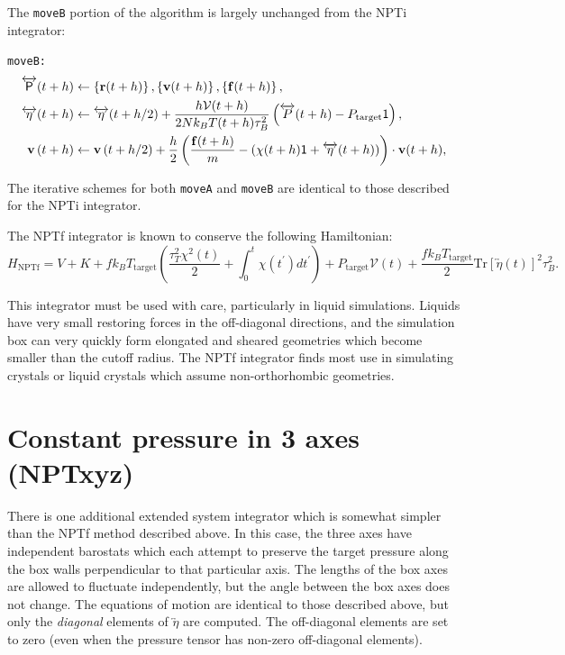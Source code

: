 \documentclass[]{book}
\begin{document}
The {\tt moveB} portion of the algorithm is largely unchanged from the
NPTi integrator:

{\tt moveB:}
\begin{align*}
\overleftrightarrow{\mathsf{P}}(t + h) &\leftarrow \left\{{\bf r}
	(t + h)\right\}, \left\{{\bf v}(t 
	+ h)\right\}, \left\{{\bf f}(t + h)\right\} ,\\
%
\overleftrightarrow{\eta}(t + h) &\leftarrow 
	\overleftrightarrow{\eta}(t + h / 2) +
	\frac{h \mathcal{V}(t + h)}{2 N k_B T(t + h) 
	\tau_B^2} \left( \overleftrightarrow{P}(t + h) 
	- P_{\mathrm{target}}\mathsf{1} \right) ,\\ 
%
{\bf v}\left(t + h \right)  &\leftarrow {\bf v}\left(t 
	+ h / 2 \right) + \frac{h}{2} \left(
	\frac{{\bf f}(t + h)}{m} - 
	(\chi(t + h)\mathsf{1} + \overleftrightarrow{\eta}(t 
	+ h)) \right) \cdot {\bf v}(t + h), \\
\end{align*}

The iterative schemes for both {\tt moveA} and {\tt moveB} are
identical to those described for the NPTi integrator.

The NPTf integrator is known to conserve the following Hamiltonian:
\begin{equation}
H_{\mathrm{NPTf}} = V + K + f k_B T_{\mathrm{target}} \left(
\frac{\tau_{T}^2 \chi^2(t)}{2} + \int_{0}^{t} \chi(t^\prime) dt^\prime
\right) + P_{\mathrm{target}} \mathcal{V}(t) + \frac{f k_B
T_{\mathrm{target}}}{2}
\mathrm{Tr}\left[\overleftrightarrow{\eta}(t)\right]^2 \tau_B^2.
\end{equation}

This integrator must be used with care, particularly in liquid
simulations.  Liquids have very small restoring forces in the
off-diagonal directions, and the simulation box can very quickly form
elongated and sheared geometries which become smaller than the cutoff
radius.  The NPTf integrator finds most use in simulating crystals or
liquid crystals which assume non-orthorhombic geometries.

\section{\label{nptxyz}Constant pressure in 3 axes (NPTxyz)}

There is one additional extended system integrator which is somewhat
simpler than the NPTf method described above.  In this case, the three
axes have independent barostats which each attempt to preserve the
target pressure along the box walls perpendicular to that particular
axis.  The lengths of the box axes are allowed to fluctuate
independently, but the angle between the box axes does not change.
The equations of motion are identical to those described above, but
only the {\it diagonal} elements of $\overleftrightarrow{\eta}$ are
computed.  The off-diagonal elements are set to zero (even when the
pressure tensor has non-zero off-diagonal elements).
\end{document}
